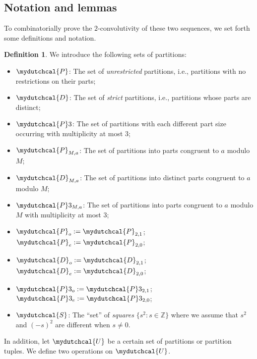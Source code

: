 \documentclass[12pt,reqno]{amsart}
\numberwithin{equation}{section}
\theoremstyle{plain}
\theoremstyle{definition}
\newtheorem{definition}[theorem]{Definition}
\theoremstyle{named}
\newcommand{\cP}{\mydutchcal{P}}
\newcommand{\cD}{\mydutchcal{D}}
\newcommand{\cS}{\mydutchcal{S}}
\newcommand{\cU}{\mydutchcal{U}}
\begin{document}
\subsection{Notation and lemmas}

To combinatorially prove the $2$-convolutivity of these two sequences, we set forth some definitions and notation.

\begin{definition}
	We introduce the following sets of partitions:
	\begin{itemize}[itemindent=*, leftmargin=*,itemsep=3pt]
		\item $\cP$: The set of \emph{unrestricted} partitions, i.e., partitions with no restrictions on their parts;
		
		\item $\cD$: The set of \emph{strict} partitions, i.e., partitions whose parts are distinct;
		
		\item $\cP3$: The set of partitions with each different part size occurring with multiplicity at most $3$;
		
		\item $\cP_{M,a}$: The set of partitions into parts congruent to $a$ modulo $M$;
		
		\item $\cD_{M,a}$: The set of partitions into distinct parts congruent to $a$ modulo $M$;
		
		\item $\cP3_{M,a}$: The set of partitions into parts congruent to $a$ modulo $M$ with multiplicity at most $3$;
		
		\item $\cP_{o} := \cP_{2,1}$; $\cP_{e} := \cP_{2,0}$;
		
		\item $\cD_{o} := \cD_{2,1}$; $\cD_{e} := \cD_{2,0}$;
		
		\item $\cP3_{o} := \cP3_{2,1}$; $\cP3_{e} := \cP3_{2,0}$;
		
		\item $\cS$: The ``set'' of \emph{squares} $\{s^2:s\in \mathbb{Z}\}$ where we assume that $s^2$ and $(-s)^2$ are different when $s\ne 0$.
	\end{itemize}
\end{definition}

In addition, let $\cU$ be a certain set of partitions or partition tuples. We define two operations on $\cU$.
\end{document}
